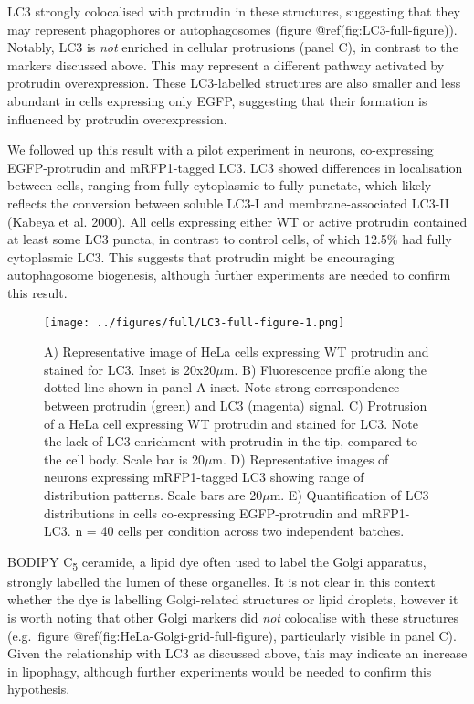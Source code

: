 \documentclass[
]{article}
\begin{document}
LC3 strongly colocalised with protrudin in these structures, suggesting
that they may represent phagophores or autophagosomes (figure
@ref(fig:LC3-full-figure)). Notably, LC3 is \emph{not} enriched in
cellular protrusions (panel C), in contrast to the markers discussed
above. This may represent a different pathway activated by protrudin
overexpression. These LC3-labelled structures are also smaller and less
abundant in cells expressing only EGFP, suggesting that their formation
is influenced by protrudin overexpression.

We followed up this result with a pilot experiment in neurons,
co-expressing EGFP-protrudin and mRFP1-tagged LC3. LC3 showed
differences in localisation between cells, ranging from fully
cytoplasmic to fully punctate, which likely reflects the conversion
between soluble LC3-I and membrane-associated LC3-II (Kabeya et al.
2000). All cells expressing either WT or active protrudin contained at
least some LC3 puncta, in contrast to control cells, of which 12.5\% had
fully cytoplasmic LC3. This suggests that protrudin might be encouraging
autophagosome biogenesis, although further experiments are needed to
confirm this result.

\begin{figure}
\centering
\texttt{[image: ../figures/full/LC3-full-figure-1.png]}
\caption{A) Representative image of HeLa cells expressing WT protrudin
and stained for LC3. Inset is 20x20\(\mu\)m. B) Fluorescence profile
along the dotted line shown in panel A inset. Note strong correspondence
between protrudin (green) and LC3 (magenta) signal. C) Protrusion of a
HeLa cell expressing WT protrudin and stained for LC3. Note the lack of
LC3 enrichment with protrudin in the tip, compared to the cell body.
Scale bar is 20\(\mu\)m. D) Representative images of neurons expressing
mRFP1-tagged LC3 showing range of distribution patterns. Scale bars are
20\(\mu\)m. E) Quantification of LC3 distributions in cells
co-expressing EGFP-protrudin and mRFP1-LC3. n = 40 cells per condition
across two independent batches.}
\end{figure}

BODIPY C\textsubscript{5} ceramide, a lipid dye often used to label the
Golgi apparatus, strongly labelled the lumen of these organelles. It is
not clear in this context whether the dye is labelling Golgi-related
structures or lipid droplets, however it is worth noting that other
Golgi markers did \emph{not} colocalise with these structures
(e.g.~figure @ref(fig:HeLa-Golgi-grid-full-figure), particularly visible
in panel C). Given the relationship with LC3 as discussed above, this
may indicate an increase in lipophagy, although further experiments
would be needed to confirm this hypothesis.
\end{document}
